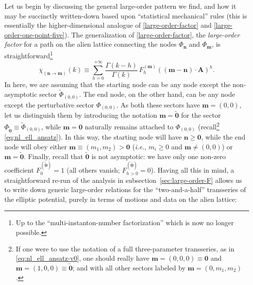 \documentclass[11pt,a4paper]{article}
\newcommand{\be}{\begin{equation}}
\newcommand{\ee}{\end{equation}}
\begin{document}
Let us begin by discussing the general large-order pattern we find, and how it may be succinctly written-down based upon ``statistical mechanical'' rules (this is essentially the higher-dimensional analogue of \eqref{large-order-factor} and \eqref{large-order-one-point-five}). The generalization of \eqref{large-order-factor}, the \textit{large-order factor} for a path on the alien lattice connecting the nodes $\Phi_{\boldsymbol{n}}$ and $\Phi_{\boldsymbol{m}}$, is straightforward\footnote{Up to the ``multi-instanton-number factorization'' which is now no longer possible.}
%
\be
\label{ell-large-order-factor}
\chi_{(\boldsymbol{n} \rightarrow \boldsymbol{m})} (k) \equiv \sum_{h=0}^{+\infty} \frac{\Gamma(k-h)}{\Gamma(k)}\, F_{h}^{(\boldsymbol{m})} \left( \left( \boldsymbol{m} - \boldsymbol{n} \right) \cdot \boldsymbol{A} \right)^h.
\ee
%
\noindent
In here, we are assuming that the starting node can be any node except the non-asymptotic sector $\widetilde{\Phi}_{(0,0)}$. The end node, on the other hand, can be any node except the perturbative sector $\Phi_{(0,0)}$. As both these sectors have $\boldsymbol{m} = (0,0)$, let us distinguish them by introducing the notation $\boldsymbol{m} = \widetilde{\boldsymbol{0}}$ for the sector $\Phi_{\widetilde{\boldsymbol{0}}} \equiv \widetilde{\Phi}_{(0,0)}$, while $\boldsymbol{m} = \boldsymbol{0}$ naturally remains attached to $\Phi_{(0,0)}$ (recall\footnote{If one were to use the notation of a full three-parameter transseries, as in \eqref{eq:nl_ell_ansatz-v0}, one should really have $\boldsymbol{m} = (0,0,0) \equiv \boldsymbol{0}$ and $\boldsymbol{m} = (1,0,0) \equiv \widetilde{\boldsymbol{0}}$; and with all other sectors labeled by $\boldsymbol{m} = (0,m_1,m_2)$.} \eqref{eq:nl_ell_ansatz}). In this way, the starting node will have $\boldsymbol{n} \ge \boldsymbol{0}$, while the end node will obey either $\boldsymbol{m} \equiv (m_1,m_2) > \boldsymbol{0}$ (\textit{i.e.}, $m_i\ge 0$ and $\boldsymbol{m} \ne (0,0)$) or $\boldsymbol{m} = \widetilde{\boldsymbol{0}}$. Finally, recall that $ \widetilde{\boldsymbol{0}}$ is not asymptotic: we have only one non-zero coefficient $F_{0}^{(\widetilde{\boldsymbol{0}})}=1$ (all others vanish; $F_{h>0}^{(\widetilde{\boldsymbol{0}})} = 0$). Having all this in mind, a straightforward re-run of the analysis in subsection~\ref{sec:large-order-F} allows us to write down generic large-order relations for the ``two-and-a-half'' transseries of the elliptic potential, purely in terms of motions and data on the alien lattice:
\end{document}
